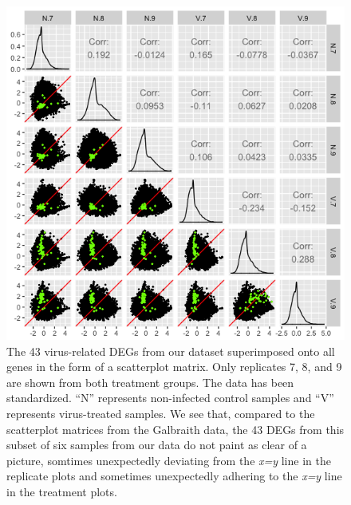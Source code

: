 \documentclass[11pt,a4paper,oldfontcommands,openany]{memoir}
\numberwithin{equation}{section} %
\begin{document}
\begin{figure}[H]
\begin{framed}
  \includegraphics[width=\textwidth]{Images/RutterSM3}
\end{framed}
  \caption{The 43 virus-related DEGs from our dataset superimposed onto all genes in the form of a scatterplot matrix. Only replicates 7, 8, and 9 are shown from both treatment groups. The data has been standardized. ``N'' represents non-infected control samples and ``V'' represents virus-treated samples. We see that, compared to the scatterplot matrices from the Galbraith data, the 43 DEGs from this subset of six samples from our data do not paint as clear of a picture, somtimes unexpectedly deviating from the \textit{x=y} line in the replicate plots and sometimes unexpectedly adhering to the \textit{x=y} line in the treatment plots.}
  \label{fig:RutterSM3}
\end{figure}
\end{document}
